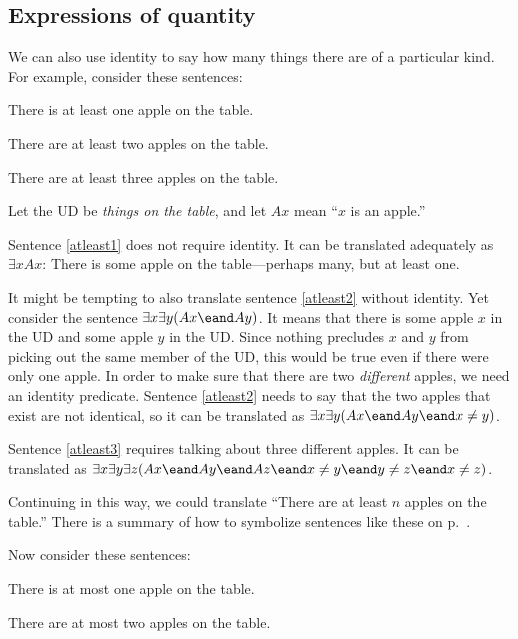 \subsection{Expressions of quantity}

We can also use identity to say how many things there are of a particular kind. For example, consider these sentences:
\begin{kormanize}
\item[\ex{atleast1}] There is at least one apple on the table.
\item[\ex{atleast2}] There are at least two apples on the table.
\item[\ex{atleast3}] There are at least three apples on the table.
\end{kormanize}
Let the UD be \emph{things on the table}, and let $Ax$ mean ``$x$ is an apple.''

Sentence \ref{atleast1} does not require identity. It can be translated adequately as $\exists x Ax$: There is some apple on the table---perhaps many, but at least one.

It might be tempting to also translate sentence \ref{atleast2} without identity. Yet consider the sentence $\exists x \exists y(Ax \eand Ay)$. It means that there is some apple $x$ in the UD and some apple $y$ in the UD. Since nothing precludes $x$ and $y$ from picking out the same member of the UD, this would be true even if there were only one apple. In order to make sure that there are two \emph{different} apples, we need an identity predicate. Sentence \ref{atleast2} needs to say that the two apples that exist are not identical, so it can be translated as $\exists x \exists y(Ax \eand Ay \eand x\neq y)$.

Sentence \ref{atleast3} requires talking about three different apples. It can be translated as $\exists x \exists y\exists z(Ax \eand Ay \eand Az \eand x\neq y \eand y\neq z \eand x \neq z)$.

Continuing in this way, we could translate ``There are at least $n$ apples on the table.'' There is a summary of how to symbolize sentences like these on p.~\pageref{summary.atleast}.


Now consider these sentences:
\begin{kormanize}
\item[\ex{atmost1}] There is at most one apple on the table.
\item[\ex{atmost2}] There are at most two apples on the table.
\end{kormanize}

